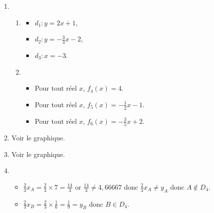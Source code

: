 %
  \begin{exr}
    \begin{enumerate}
    \item 
      \begin{enumerate}
      \item 
        \begin{multicols}{3}
          \begin{itemize}
          \item  $d_1 \colon y=2x+1$,
          \item  $d_2 \colon y=-\frac34x-2$,
          \item  $d_3 \colon x=-3$.
          \end{itemize}
        \end{multicols}
      \item 
          \begin{itemize}
          \item Pour tout réel $x$,  $f_4(x)=4$.
          \item Pour tout réel $x$,  $f_5(x)=-\frac12x-1$.
          \item Pour tout réel $x$,  $f_6(x)=-\frac35x+2$.
          \end{itemize}
      \end{enumerate}
    \item Voir le graphique.
    \item Voir le graphique.
    \item 
      \begin{itemize}
      \item $\frac23x_A=\frac23\times 7=\frac{14}3$ or $\frac{14}{3}\neq4,66667$ donc $\frac23x_A\neq y_A$ donc $A\not\in D_4$.
      \item $\frac23x_B=\frac23\times\frac16=\frac{1}9=y_B$ donc $B\in D_4$.
      \end{itemize}
%        

\end{enumerate}
\end{exr}
